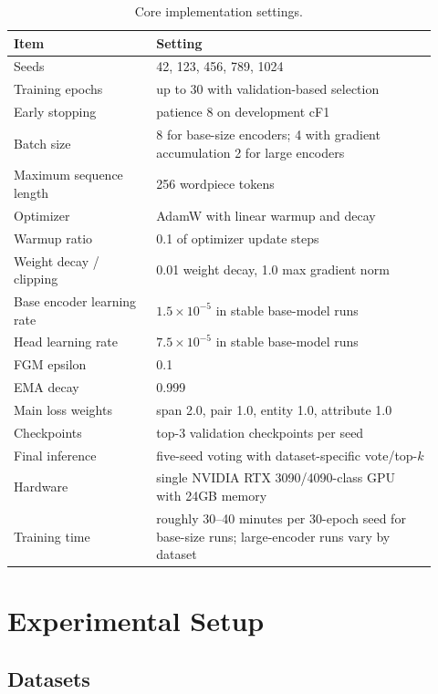 \documentclass[runningheads]{llncs}
\begin{document}
\begin{table}[!h]
\centering
\caption{Core implementation settings.}
\label{tab:impl}
\footnotesize
\begin{tabular}{p{0.31\linewidth}p{0.61\linewidth}}
\toprule
Item & Setting \\
\midrule
Seeds & 42, 123, 456, 789, 1024 \\
Training epochs & up to 30 with validation-based selection \\
Early stopping & patience 8 on development cF1 \\
Batch size & 8 for base-size encoders; 4 with gradient accumulation 2 for large encoders \\
Maximum sequence length & 256 wordpiece tokens \\
Optimizer & AdamW with linear warmup and decay \\
Warmup ratio & 0.1 of optimizer update steps \\
Weight decay / clipping & 0.01 weight decay, 1.0 max gradient norm \\
Base encoder learning rate & $1.5\times 10^{-5}$ in stable base-model runs \\
Head learning rate & $7.5\times 10^{-5}$ in stable base-model runs \\
FGM epsilon & 0.1 \\
EMA decay & 0.999 \\
Main loss weights & span 2.0, pair 1.0, entity 1.0, attribute 1.0 \\
Checkpoints & top-3 validation checkpoints per seed \\
Final inference & five-seed voting with dataset-specific vote/top-$k$ \\
Hardware & single NVIDIA RTX 3090/4090-class GPU with 24GB memory \\
Training time & roughly 30--40 minutes per 30-epoch seed for base-size runs; large-encoder runs vary by dataset \\
\bottomrule
\end{tabular}
\end{table}

\section{Experimental Setup}

\subsection{Datasets}
\end{document}
